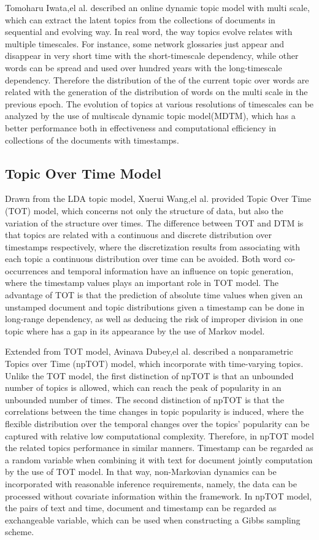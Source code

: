 Tomoharu Iwata,el al. \cite{iwata2010online}described an online dynamic topic model with multi scale, which can extract  the latent topics from the collections of documents  in sequential and evolving way.  In real word, the way topics evolve relates with multiple timescales. For instance, some network glossaries just appear and disappear in very short time with the short-timescale dependency, while other words can be spread and used over hundred years with the long-timescale dependency. Therefore the distribution of the of the current topic over words are related with the generation of the distribution of words on the multi scale in the previous epoch. The evolution of topics at various resolutions of timescales can be analyzed by the use of multiscale dynamic topic model(MDTM), which has a better performance both in effectiveness and computational efficiency in collections of the documents with timestamps.

\subsection{Topic Over Time Model}
Drawn from the LDA topic model, Xuerui Wang,el al. \cite{wang2006topics} provided Topic Over Time (TOT) model, which concerns not only the structure of data, but also the variation of the structure over times. The difference between TOT and DTM is that topics are related with a continuous and discrete distribution over timestamps respectively, where the discretization results from associating with each topic a continuous distribution over time can be avoided. Both word co-occurrences and temporal information have an influence on topic generation, where the timestamp values plays an important role in TOT model. The advantage of TOT is that the prediction of absolute time values when given an unstamped document and topic distributions given a timestamp can be done in long-range dependency, as well as deducing the risk of improper division in one topic where has a gap in its appearance by the use of Markov model.

Extended from TOT model, Avinava Dubey,el al. \cite{dubey2013nonparametric} described a nonparametric Topics over Time (npTOT) model, which incorporate with time-varying topics. Unlike the TOT model, the first distinction of npTOT is that an unbounded number of topics is allowed, which can reach the peak of popularity in an unbounded number of times. The second distinction of npTOT is that the correlations between the time changes in topic popularity is induced, where the flexible distribution over the temporal changes over the topics’ popularity can be captured with relative low computational complexity. Therefore, in npTOT model the related topics performance in similar manners. Timestamp can be regarded as a random variable when combining it with text for document jointly computation by the use of TOT model. In that way, non-Markovian dynamics can be incorporated with reasonable inference requirements, namely, the data can be processed without covariate information within the framework. In npTOT model, the pairs of text and time, document and timestamp can be regarded as exchangeable variable, which can be used when constructing a Gibbs sampling scheme.

